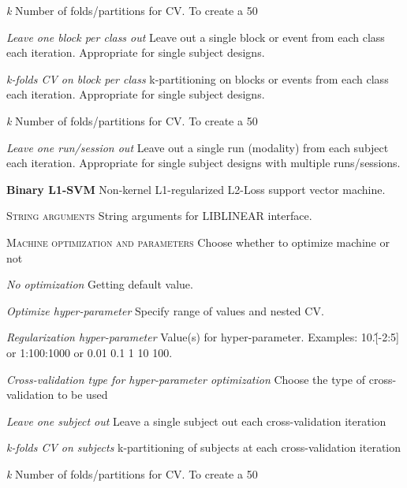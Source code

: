 \textit{k}
Number of folds/partitions for CV. To create a 50%


\textit{Leave one block per class out}
Leave out a single block or event from each class each iteration. Appropriate for single subject designs.


\textit{k-folds CV on block per class}
k-partitioning on blocks or events from each class each iteration. Appropriate for single subject designs.


\textit{k}
Number of folds/partitions for CV. To create a 50%


\textit{Leave one run/session out}
Leave out a single run (modality) from each subject each iteration. Appropriate for single subject designs with multiple runs/sessions.


\textbf{Binary L1-SVM}
Non-kernel L1-regularized L2-Loss support vector machine.


\textsc{String arguments}
String arguments for LIBLINEAR interface.


\textsc{Machine optimization and parameters}
Choose whether to optimize machine or not


\textsl{No optimization}
Getting default value.


\textsl{Optimize hyper-parameter}
Specify range of values and nested CV.


\textit{Regularization hyper-parameter}
Value(s) for hyper-parameter. Examples: 10.\^[-2:5] or 1:100:1000 or 0.01 0.1 1 10 100.


\textit{Cross-validation type for hyper-parameter optimization}
Choose the type of cross-validation to be used


\textit{Leave one subject out}
Leave a single subject out each cross-validation iteration


\textit{k-folds CV on subjects}
k-partitioning of subjects at each cross-validation iteration


\textit{k}
Number of folds/partitions for CV. To create a 50%


